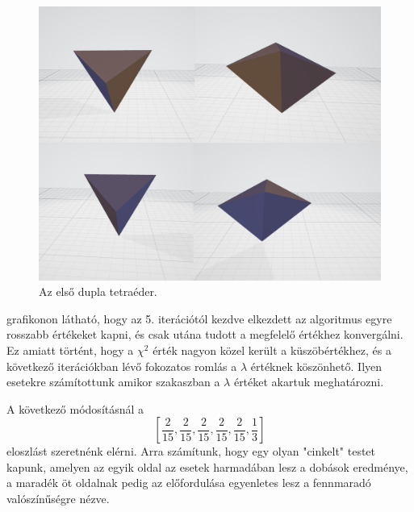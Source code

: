 \begin{figure}[h!]
	\centering
	\includegraphics[width=\textwidth]{images/double01obj.png}
	\caption{Az első dupla tetraéder.}
	\label{fig:double01obj}
\end{figure}

 grafikonon látható, hogy az 5. iterációtól kezdve elkezdett az algoritmus egyre rosszabb értékeket kapni, és csak utána tudott a megfelelő értékhez konvergálni.
Ez amiatt történt, hogy a $\chi^2$ érték nagyon közel került a küszöbértékhez, és a következő iterációkban lévő fokozatos romlás a $\lambda$ értéknek köszönhető.
Ilyen esetekre számítottunk amikor  szakaszban a $\lambda$ értéket akartuk meghatározni.

A következő módosításnál a
\[
\left[\frac{2}{15}, \frac{2}{15}, \frac{2}{15}, \frac{2}{15}, \frac{2}{15}, \frac{1}{3}\right]
\]
eloszlást szeretnénk elérni.
Arra számítunk, hogy egy olyan "cinkelt" testet kapunk, amelyen az egyik oldal az esetek harmadában lesz a dobások eredménye, a maradék öt oldalnak pedig az előfordulása egyenletes lesz a fennmaradó valószínűségre nézve.

